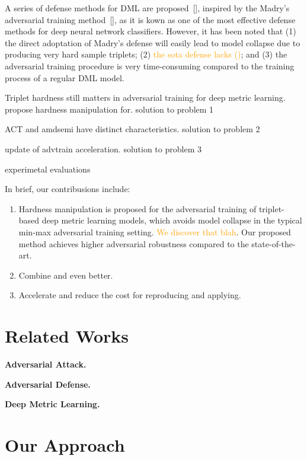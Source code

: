 \documentclass[10pt,twocolumn,letterpaper]{article}
\newcommand{\oo}[1]{\textcolor{orange}{#1}}
\begin{document}
A series of defense methods for DML are proposed~[], inspired by the Madry's
adversarial training method~[], as it is kown as one of the most effective
defense methods for deep neural network classifiers.
%
However, it has been noted that
%
(1) the direct adoptation of Madry's defense will easily lead to model collapse
due to producing very hard sample triplets;
%
(2) \oo{the sota defense lacks ()};
%
and (3) the adversarial training procedure is very time-consuming compared
to the training process of a regular DML model.

Triplet hardness still matters in adversarial training for deep metric
learning.
%
propose hardness manipulation for.
solution to problem 1

ACT and amdsemi have distinct characteristics.
solution to problem 2

update of advtrain acceleration.
solution to problem 3

experimetal evaluations

In brief, our contribusions include:
%
\begin{enumerate}
	\item Hardness manipulation is proposed for the adversarial training
		of triplet-based deep metric learning models, which avoids model
		collapse in the typical min-max adversarial training setting.
		\oo{We discover that blah}.
		Our proposed method achieves higher adversarial robustness compared
		to the state-of-the-art.
	\item Combine and even better.
	\item Accelerate and reduce the cost for reproducing and applying.
\end{enumerate}

\section{Related Works}
\label{sec:2}

\textbf{Adversarial Attack.}

\textbf{Adversarial Defense.}

\textbf{Deep Metric Learning.}
\cite{advrank,advorder,robrank}

\section{Our Approach}
\label{sec:3}
\end{document}
